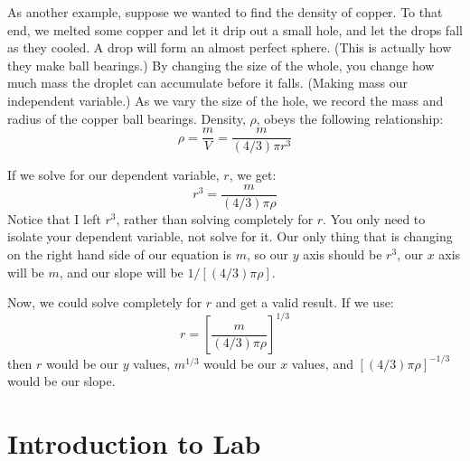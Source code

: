 \documentclass[twoside,11pt,ShortChapTitles]{BYUTextbook}
\begin{document}
As another example, suppose we wanted to find the density of copper.  To that end, we melted some copper and let it drip out a small hole, and let the drops fall as they cooled.  A drop will form an almost perfect sphere. (This is actually how they make ball bearings.)  By changing the size of the whole, you change how much mass the droplet can accumulate before it falls.  (Making mass our independent variable.)  As we vary the size of the hole, we record the mass and radius of the copper ball bearings.  Density, $\rho$, obeys the following relationship:
\[\rho = \frac{m}{V}=\frac{m}{(4/3)\pi r^3}\]

If we solve for our dependent variable, $r$, we get:
\[r^3=\frac{m}{(4/3)\pi\rho}\]
Notice that I left $r^3$, rather than solving completely for $r$.  You only need to isolate your dependent variable, not solve for it.  Our only thing that is changing on the right hand side of our equation is $m$, so our $y$ axis should be $r^3$, our $x$ axis will be $m$, and our slope will be $1/\left[\left(4/3\right)\pi\rho\right]$.

Now, we could solve completely for $r$ and get a valid result.  If we use:
\[r=\left[\frac{m}{(4/3)\pi\rho}\right]^{1/3}\]
then $r$ would be our $y$ values, $m^{1/3}$ would be our $x$ values, and $\left[\left(4/3\right)\pi\rho\right]^{-1/3}$ would be our slope.


\section{Introduction to Lab}
\end{document}
